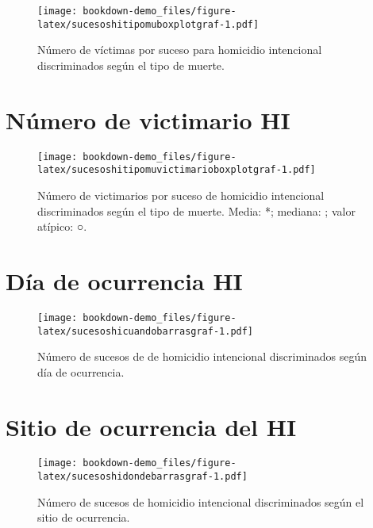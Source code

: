 \documentclass[
]{book}
\begin{document}
\begin{figure}
\centering
\texttt{[image: bookdown-demo\_files/figure-latex/sucesoshitipomuboxplotgraf-1.pdf]}
\caption{\label{fig:sucesoshitipomuboxplotgraf}Número de víctimas por suceso para homicidio intencional discriminados según el tipo de muerte.}
\end{figure}

\hypertarget{nuxfamero-de-victimario-hi}{%
\section{Número de victimario HI}\label{nuxfamero-de-victimario-hi}}



\begin{figure}
\centering
\texttt{[image: bookdown-demo\_files/figure-latex/sucesoshitipomuvictimarioboxplotgraf-1.pdf]}
\caption{\label{fig:sucesoshitipomuvictimarioboxplotgraf}Número de victimarios por suceso de homicidio intencional discriminados según el tipo de muerte. Media: *; mediana: \textbar; valor atípico: ○.}
\end{figure}

\hypertarget{duxeda-de-ocurrencia-hi}{%
\section{Día de ocurrencia HI}\label{duxeda-de-ocurrencia-hi}}



\begin{figure}
\centering
\texttt{[image: bookdown-demo\_files/figure-latex/sucesoshicuandobarrasgraf-1.pdf]}
\caption{\label{fig:sucesoshicuandobarrasgraf}Número de sucesos de de homicidio intencional discriminados según día de ocurrencia.}
\end{figure}

\hypertarget{sitio-de-ocurrencia-del-hi}{%
\section{Sitio de ocurrencia del HI}\label{sitio-de-ocurrencia-del-hi}}



\begin{figure}
\centering
\texttt{[image: bookdown-demo\_files/figure-latex/sucesoshidondebarrasgraf-1.pdf]}
\caption{\label{fig:sucesoshidondebarrasgraf}Número de sucesos de homicidio intencional discriminados según el sitio de ocurrencia.}
\end{figure}
\end{document}
